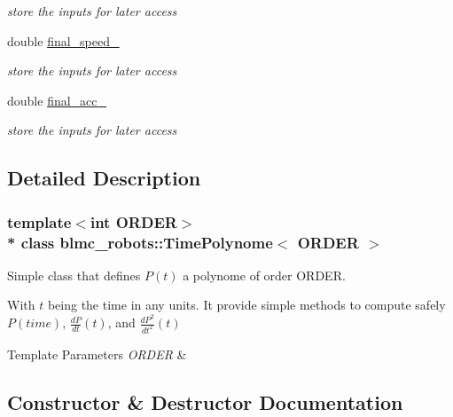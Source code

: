 \begin{DoxyCompactItemize}
\begin{DoxyCompactList}\small\item\em store the inputs for later access \end{DoxyCompactList}\item 
double \hyperlink{classblmc__robots_1_1TimePolynome_ac20c24571ce32d08834bc4d0530ed5e3}{final\+\_\+speed\+\_\+}\hypertarget{classblmc__robots_1_1TimePolynome_ac20c24571ce32d08834bc4d0530ed5e3}{}\label{classblmc__robots_1_1TimePolynome_ac20c24571ce32d08834bc4d0530ed5e3}

\begin{DoxyCompactList}\small\item\em store the inputs for later access \end{DoxyCompactList}\item 
double \hyperlink{classblmc__robots_1_1TimePolynome_acdd91502f4a2e71f70539d1087347067}{final\+\_\+acc\+\_\+}\hypertarget{classblmc__robots_1_1TimePolynome_acdd91502f4a2e71f70539d1087347067}{}\label{classblmc__robots_1_1TimePolynome_acdd91502f4a2e71f70539d1087347067}

\begin{DoxyCompactList}\small\item\em store the inputs for later access \end{DoxyCompactList}\end{DoxyCompactItemize}


\subsection{Detailed Description}
\subsubsection*{template$<$int O\+R\+D\+ER$>$\\*
class blmc\+\_\+robots\+::\+Time\+Polynome$<$ O\+R\+D\+E\+R $>$}

Simple class that defines $ P(t) $ a polynome of order O\+R\+D\+ER. 

With $ t $ being the time in any units. It provide simple methods to compute safely $ P(time) $, $ \frac{dP}{dt}(t) $, and $ \frac{dP^2}{dt^2}(t) $


\begin{DoxyTemplParams}{Template Parameters}
{\em O\+R\+D\+ER} & \\
\hline
\end{DoxyTemplParams}


\subsection{Constructor \& Destructor Documentation}
